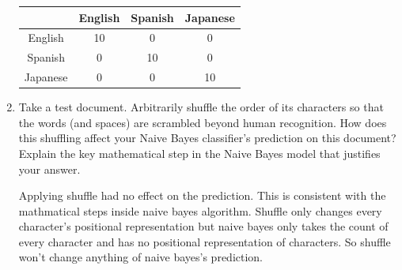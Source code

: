\documentclass[a4paper]{article}
\theoremstyle{definition}
\newenvironment{soln}{
    \leavevmode\color{blue}\ignorespaces
}{}
\begin{document}
\begin{enumerate}
\begin{center}
\begin{tabular}{c|ccc}
& English & Spanish & Japanese \\
\hline
English& 10 &0 &0 \\  
Spanish& 0& 10 &0\\ 
Japanese& 0& 0 & 10
\end{tabular}
\end{center}

\item Take a test document.   Arbitrarily shuffle the order of its characters so that the words (and spaces) are scrambled beyond human recognition.  How does this shuffling affect your Naive Bayes classifier's prediction on this document?  Explain the key mathematical step in the Naive Bayes model that justifies your answer.

\begin{soln}
Applying shuffle had no effect on the prediction. This is consistent with the mathmatical steps inside naive bayes algorithm.  Shuffle only changes every character's positional representation but naive bayes only takes the count of every character and has no positional representation of characters. So shuffle won't change anything of naive bayes's prediction.\\
\end{soln}

\end{enumerate}
\end{document}
